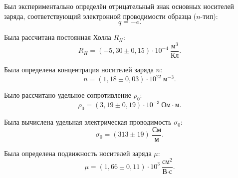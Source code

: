 \documentclass[12pt,a4paper]{article}
\begin{document}
Был экспериментально определён отрицательный знак основных
носителей заряда, соответствующий электронной проводимости
образца ($n$-тип):
\[
    q=-e.
\]

Была рассчитана постоянная Холла $R_H$:
\[
 R_H=(-5{,}30\pm0{,}15)\cdot10^{-4}\
 \frac{\text{м}^3}{\text{Кл}}.
\]

Была определена концентрация носителей заряда $n$:
\[
 n=(1{,}18\pm0{,}03)\cdot10^{22}\ \text{м}^{-3}.
\]

Было рассчитано удельное сопротивление $\rho_0$:
\[
 \rho_0=(3{,}19\pm0{,}19)\cdot10^{-3}\
 \text{Ом}\cdot\text{м}.
\]

Была вычислена удельная электрическая проводимость $\sigma_0$:
\[
 \sigma_0=(313\pm19)\ \frac{\text{См}}{\text{м}}.
\]

Была определена подвижность носителей заряда $\mu$:
\[
 \mu=(1{,}66\pm0{,}11)\cdot10^3\
 \frac{\text{см}^2}{\text{В}\cdot\text{с}}.
\]
\end{document}
